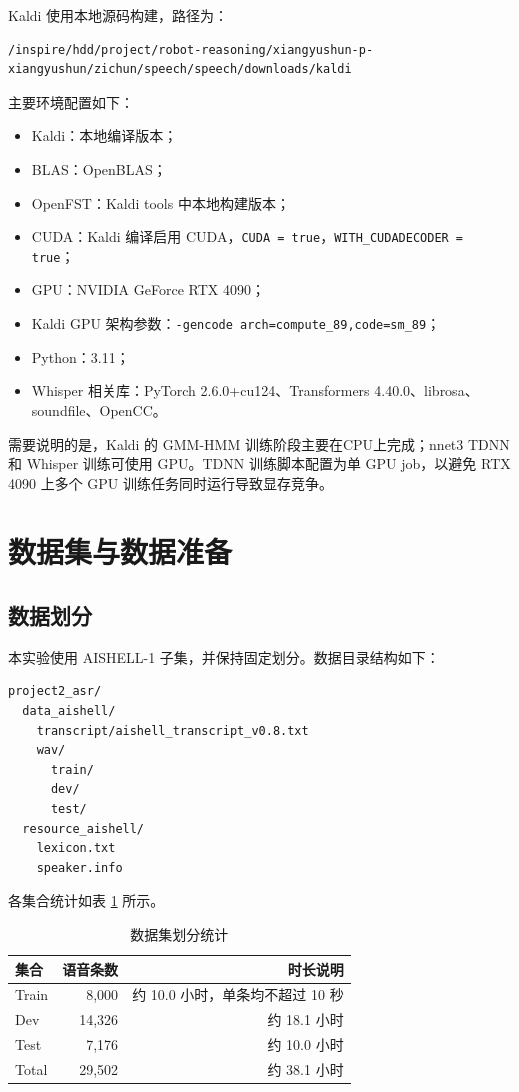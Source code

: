 \documentclass[UTF8,a4paper,12pt]{ctexart}
\begin{document}
Kaldi 使用本地源码构建，路径为：

\begin{lstlisting}
/inspire/hdd/project/robot-reasoning/xiangyushun-p-xiangyushun/zichun/speech/speech/downloads/kaldi
\end{lstlisting}

主要环境配置如下：

\begin{itemize}
  \item Kaldi：本地编译版本；
  \item BLAS：OpenBLAS；
  \item OpenFST：Kaldi tools 中本地构建版本；
  \item CUDA：Kaldi 编译启用 CUDA，\texttt{CUDA = true}，\texttt{WITH\_CUDADECODER = true}；
  \item GPU：NVIDIA GeForce RTX 4090；
  \item Kaldi GPU 架构参数：\texttt{-gencode arch=compute\_89,code=sm\_89}；
  \item Python：3.11；
  \item Whisper 相关库：PyTorch 2.6.0+cu124、Transformers 4.40.0、librosa、soundfile、OpenCC。
\end{itemize}

需要说明的是，Kaldi 的 GMM-HMM 训练阶段主要在CPU上完成；nnet3 TDNN 和 Whisper 训练可使用 GPU。TDNN 训练脚本配置为单 GPU job，以避免 RTX 4090 上多个 GPU 训练任务同时运行导致显存竞争。

\section{数据集与数据准备}

\subsection{数据划分}

本实验使用 AISHELL-1 子集，并保持固定划分。数据目录结构如下：

\begin{lstlisting}
project2_asr/
  data_aishell/
    transcript/aishell_transcript_v0.8.txt
    wav/
      train/
      dev/
      test/
  resource_aishell/
    lexicon.txt
    speaker.info
\end{lstlisting}

各集合统计如表 \ref{tab:data-stat} 所示。

\begin{table}[htbp]
  \centering
  \caption{数据集划分统计}
  \label{tab:data-stat}
  \begin{tabular}{lrr}
    \toprule
    集合 & 语音条数 & 时长说明 \\
    \midrule
    Train & 8,000 & 约 10.0 小时，单条均不超过 10 秒 \\
    Dev & 14,326 & 约 18.1 小时 \\
    Test & 7,176 & 约 10.0 小时 \\
    Total & 29,502 & 约 38.1 小时 \\
    \bottomrule
  \end{tabular}
\end{table}
\end{document}
